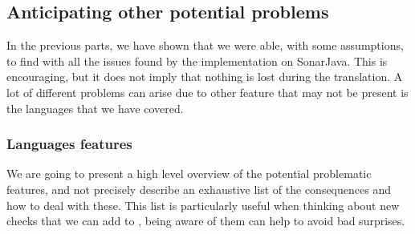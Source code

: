 \subsection{Anticipating other potential problems}
\label{subsec:anticipating_problems}

In the previous parts, we have shown that we were able, with some assumptions, to find with \slang{} all the issues found by the implementation on SonarJava. 
This is encouraging, but it does not imply that nothing is lost during the translation.
A lot of different problems can arise due to other feature that may not be present is the languages that we have covered.

\subsubsection{Languages features}
\label{subsubsec:other_language_features}
We are going to present a high level overview of the potential problematic features, and not precisely describe an exhaustive list of the consequences and how to deal with these.
This list is particularly useful when thinking about new checks that we can add to \slang, being aware of them can help to avoid bad surprises.

